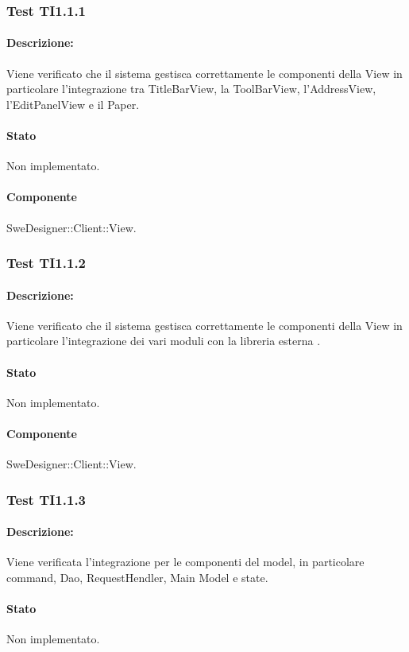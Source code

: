\documentclass[../PianoDiQualifica.tex]{subfiles}
\begin{document}
	\subsubsection{Test TI1.1.1}
	\paragraph{Descrizione:} Viene verificato che il sistema gestisca correttamente le componenti della View in particolare l'integrazione tra TitleBarView, la ToolBarView, l'AddressView, l'EditPanelView e il Paper.
	\paragraph{Stato} Non implementato.
	\paragraph{Componente} SweDesigner::Client::View.
	
	\subsubsection{Test TI1.1.2}
	\paragraph{Descrizione:} Viene verificato che il sistema gestisca correttamente le componenti della View in particolare l'integrazione dei vari moduli con la libreria esterna  . %
	\paragraph{Stato} Non implementato.
	\paragraph{Componente} SweDesigner::Client::View.
	
	\subsubsection{Test TI1.1.3}
	\paragraph{Descrizione:} Viene verificata l'integrazione per le componenti del model, in particolare command, Dao, RequestHendler, Main Model e state.
	\paragraph{Stato} Non implementato.
\end{document}
